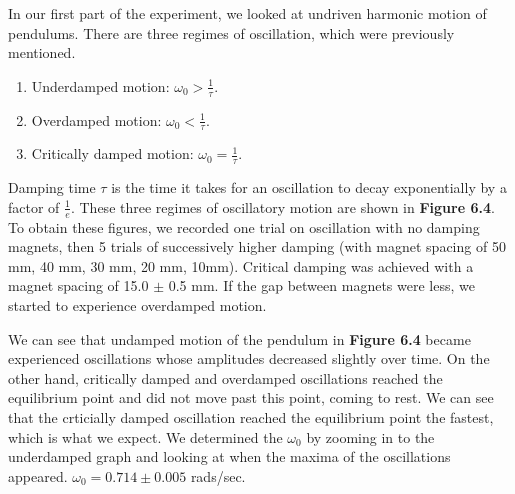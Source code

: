 \documentclass[11pt]{report}
\begin{document}

In our first part of the experiment, we looked at undriven harmonic motion of
pendulums. There are three regimes of oscillation, which were previously mentioned.
\begin{enumerate}
    \item Underdamped motion: \(\omega_0 > \frac{1}{\tau}\). 
    \item Overdamped motion: \(\omega_0 < \frac{1}{\tau}\).
    \item Critically damped motion: \(\omega_0 = \frac{1}{\tau}\).
\end{enumerate}
Damping time $\tau$ is the time it takes for an oscillation to decay exponentially by a
factor of $\frac{1}{e}$.
These three regimes of oscillatory motion are shown in \textbf{Figure 6.4}. To
obtain these figures, we recorded one trial on oscillation with no damping
magnets, then 5 trials of successively higher damping (with magnet spacing of
50 mm, 40 mm, 30 mm, 20 mm, 10mm).  Critical damping was achieved with a magnet
spacing of 15.0 $\pm$ 0.5 mm.  If the gap between magnets were less, we started
to experience overdamped motion. 

We can see that undamped motion of the pendulum in \textbf{Figure 6.4} became
experienced oscillations whose amplitudes decreased slightly over time.  On the
other hand, critically damped and overdamped oscillations reached the
equilibrium point and did not move past this point, coming to rest.  We can see
that the crticially damped oscillation reached the equilibrium point the
fastest, which is what we expect. 
We determined the \(\omega_0\) by zooming in to the underdamped graph and
looking at when the maxima of the oscillations appeared.  \(\omega_0 = 0.714
\pm 0.005\) rads/sec.
\end{document}
